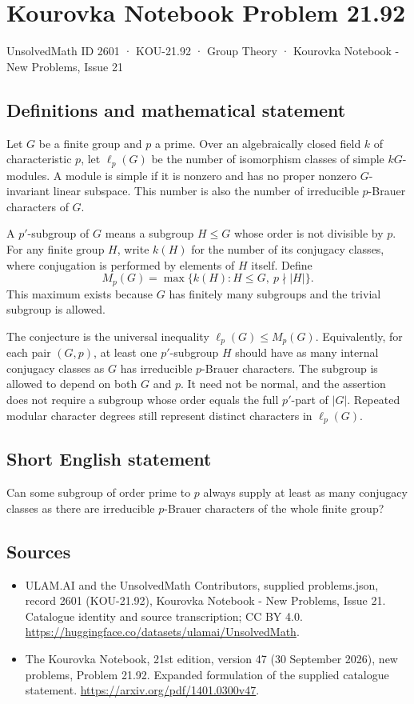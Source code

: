 \documentclass[11pt,a4paper]{article}
\begin{document}
\section*{Kourovka Notebook Problem 21.92}\label{2601}
{\small UnsolvedMath ID 2601 · KOU-21.92 · Group Theory · Kourovka Notebook - New Problems, Issue 21}
\subsection{Definitions and mathematical statement}
Let $G$ be a finite group and $p$ a prime. Over an algebraically closed field $k$ of characteristic $p$, let $\ell_p(G)$ be the number of isomorphism classes of simple $kG$-modules. A module is simple if it is nonzero and has no proper nonzero $G$-invariant linear subspace. This number is also the number of irreducible $p$-Brauer characters of $G$.

A $p'$-subgroup of $G$ means a subgroup $H\le G$ whose order is not divisible by $p$. For any finite group $H$, write $k(H)$ for the number of its conjugacy classes, where conjugation is performed by elements of $H$ itself. Define
\[
 M_p(G)=\max\{k(H):H\le G,\ p\nmid|H|\}.
\]
This maximum exists because $G$ has finitely many subgroups and the trivial subgroup is allowed.

The conjecture is the universal inequality $\ell_p(G)\le M_p(G)$. Equivalently, for each pair $(G,p)$, at least one $p'$-subgroup $H$ should have as many internal conjugacy classes as $G$ has irreducible $p$-Brauer characters. The subgroup is allowed to depend on both $G$ and $p$. It need not be normal, and the assertion does not require a subgroup whose order equals the full $p'$-part of $|G|$. Repeated modular character degrees still represent distinct characters in $\ell_p(G)$.
\subsection{Short English statement}
Can some subgroup of order prime to $p$ always supply at least as many conjugacy classes as there are irreducible $p$-Brauer characters of the whole finite group?
\subsection{Sources}
\begin{itemize}
\item[S1] ULAM.AI and the UnsolvedMath Contributors, supplied problems.json, record 2601 (KOU-21.92), Kourovka Notebook - New Problems, Issue 21. Catalogue identity and source transcription; CC BY 4.0.
\url{https://huggingface.co/datasets/ulamai/UnsolvedMath}.
\item[S2] The Kourovka Notebook, 21st edition, version 47 (30 September 2026), new problems, Problem 21.92. Expanded formulation of the supplied catalogue statement.
\url{https://arxiv.org/pdf/1401.0300v47}.
\end{itemize}
\end{document}

